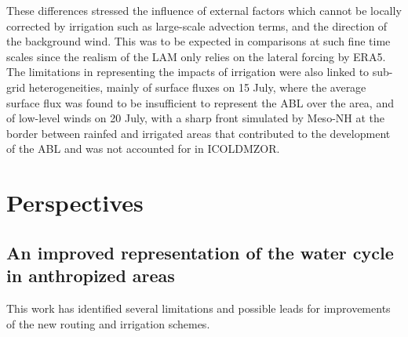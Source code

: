 These differences stressed the influence of external factors which cannot be locally corrected by irrigation such as large-scale advection terms, and the direction of the background wind. This was to be expected in comparisons at such fine time scales since the realism of the LAM only relies on the lateral forcing by ERA5.
The limitations in representing the impacts of irrigation were also linked to sub-grid heterogeneities, mainly of surface fluxes on 15 July, where the average surface flux was found to be insufficient to represent the ABL over the area, and of low-level winds on 20 July, with a sharp front simulated by Meso-NH at the border between rainfed and irrigated areas that contributed to the development of the ABL and was not accounted for in ICOLDMZOR.

\section{Perspectives}



\subsection{An improved representation of the water cycle in anthropized areas}
\label{sec:orchidee_perspectives}
This work has identified several limitations and possible leads for improvements of the new routing and irrigation schemes.

